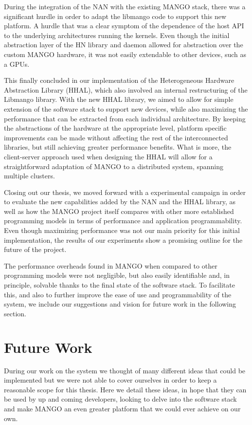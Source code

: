 During the integration of the NAN with the existing MANGO stack, there was a significant hurdle in order to adapt the libmango code to support this new platform. A hurdle that was a clear symptom of the dependence of the host API to the underlying architectures running the kernels. Even though the initial abstraction layer of the HN library and daemon allowed for abstraction over the custom MANGO hardware, it was not easily extendable to other devices, such as a GPUs.

This finally concluded in our implementation of the Heterogeneous Hardware Abstraction Library (HHAL), which also involved an internal restructuring of the Libmango library. With the new HHAL library, we aimed to allow for simple extension of the software stack to support new devices, while also maximizing the performance that can be extracted from each individual architecture. By keeping the abstractions of the hardware at the appropriate level, platform specific improvements can be made without affecting the rest of the interconnected libraries, but still achieving greater performance benefits. What is more, the client-server approach used when designing the HHAL will allow for a straightforward adaptation of MANGO to a distributed system, spanning multiple clusters.

Closing out our thesis, we moved forward with a experimental campaign in order to evaluate the new capabilities added by the NAN and the HHAL library, as well as how the MANGO project itself compares with other more established programming models in terms of performance and application programmability. Even though maximizing performance was not our main priority for this initial implementation, the results of our experiments show a promising outline for the future of the project. 

The performance overheads found in MANGO when compared to other programming models were not negligible, but also easily identifiable and, in principle, solvable thanks to the final state of the software stack. To facilitate this, and also to further improve the ease of use and programmability of the system, we include our suggestions and vision for future work in the following section.

\section{Future Work} \label{sect:future-work}

During our work on the system we thought of many different ideas that could be implemented but we were not able to cover ourselves in order to keep a reasonable scope for this thesis. Here we detail these ideas, in hope that they can be used by up and coming developers, looking to delve into the software stack and make MANGO an even greater platform that we could ever achieve on our own.

